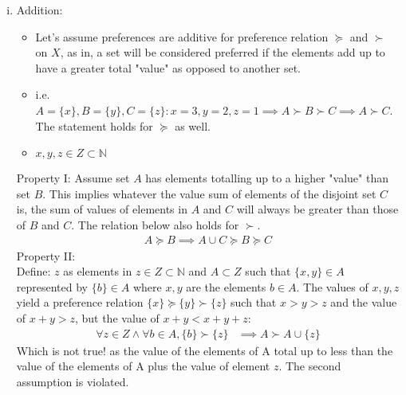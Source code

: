 \documentclass{article}
\begin{document}
\begin{enumerate}[(a)]
\begin{enumerate}[(i)]
        \item  Addition: \begin{itemize}
            \item Let's assume preferences are additive for preference relation $\succeq$ and $\succ$ on $X$, as in, a set will be considered preferred if the elements add up to have a greater total "value" as opposed to another set. 
           \item i.e. $ A=\{x\}, B=\{y\},  C=\{z\}: x=3, y=2, z=1 \implies A\succ B\succ C\implies A\succ C$. The statement holds for $\succeq$ as well. 
        \item $x,y ,z\in Z\subset \mathbb{N}$
            \end{itemize}
            
        Property I: Assume set $A$ has elements totalling up to a higher "value" than set $B$. This implies whatever the value sum of elements of the disjoint set $C$ is, the sum of values of elements in $A$ and $C$ will always be greater than those of $B$ and $C$. The relation below also holds for $\succ$. 
        \begin{align}
      A\succeq B \implies A\cup C \succeq B\succeq C
        \end{align}
        Property II: \\Define: $z$ as elements in $z\in Z\subset \mathbb{N}$ and $A\subset Z$ such that  $\{x, y\} \in A$ represented by $\{b\} \in A$ where $x, y$ are the elements $b\in A$. The values of $x, y, z$ yield a preference relation $\{x\} \succeq \{y\} \succ \{z\}$ such that $x>y>z$ and the value of $x+y > z$, but the value of $x+y < x+y+z$:
        \begin{align}
            \forall z\in Z\land \forall b\in A, \{b\}\succ \{z\} &\implies A \succ A\cup \{z\}
        \end{align}
        Which is not true!  as the value of the elements of A total up to less than the value of the elements of A plus the value of element $z$. The second assumption is violated. 
        

\end{enumerate}
\end{enumerate}
\end{document}
